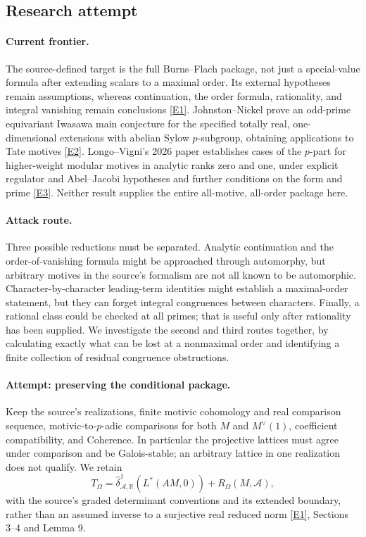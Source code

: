 \documentclass[11pt,a4paper]{article}
\newcommand{\R}{\mathbb{R}}
\newcommand{\eref}[2]{\hyperlink{extra:#1:#2}{[E#2]}}
\numberwithin{equation}{section}
\begin{document}
\subsection{Research attempt}

\paragraph{Current frontier.}
The source-defined target is the full Burns--Flach package, not just a special-value formula after extending scalars to a maximal order. Its external hypotheses remain assumptions, whereas continuation, the order formula, rationality, and integral vanishing remain conclusions \eref{30006700}{1}. Johnston--Nickel prove an odd-prime equivariant Iwasawa main conjecture for the specified totally real, one-dimensional extensions with abelian Sylow $p$-subgroup, obtaining applications to Tate motives \eref{30006700}{2}. Longo--Vigni's 2026 paper establishes cases of the $p$-part for higher-weight modular motives in analytic ranks zero and one, under explicit regulator and Abel--Jacobi hypotheses and further conditions on the form and prime \eref{30006700}{3}. Neither result supplies the entire all-motive, all-order package here.

\paragraph{Attack route.}
Three possible reductions must be separated. Analytic continuation and the order-of-vanishing formula might be approached through automorphy, but arbitrary motives in the source's formalism are not all known to be automorphic. Character-by-character leading-term identities might establish a maximal-order statement, but they can forget integral congruences between characters. Finally, a rational class could be checked at all primes; that is useful only after rationality has been supplied. We investigate the second and third routes together, by calculating exactly what can be lost at a nonmaximal order and identifying a finite collection of residual congruence obstructions.

\paragraph{Attempt: preserving the conditional package.}
Keep the source's realizations, finite motivic cohomology and real comparison sequence, motivic-to-$p$-adic comparisons for both $M$ and $M^\vee(1)$, coefficient compatibility, and Coherence. In particular the projective lattices must agree under comparison and be Galois-stable; an arbitrary lattice in one realization does not qualify. We retain
\[
 T_\Omega=\widehat\delta^1_{\mathcal A,\R}(L^*(AM,0))
                       +R_\Omega(M,\mathcal A),
\]
with the source's graded determinant conventions and its extended boundary, rather than an assumed inverse to a surjective real reduced norm \eref{30006700}{1}, Sections 3--4 and Lemma 9.
\end{document}
